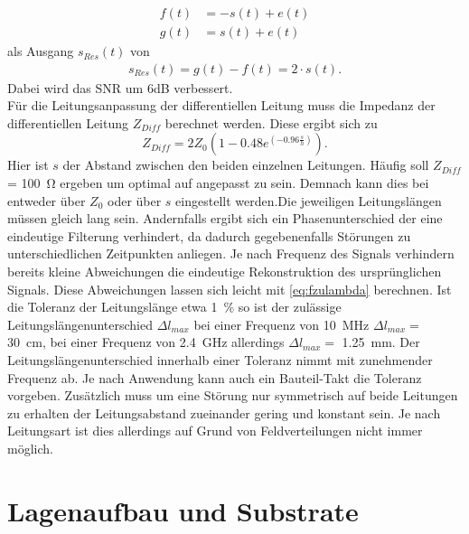 \begin{align}
f(t) &= -s(t) + e(t) \\
g(t) &=  s(t) + e(t)
\end{align}
als Ausgang $s_{Res}(t)$ von
\begin{align}
s_{Res}(t) = g(t) - f(t)= 2\cdot s(t).
\end{align}
Dabei wird das SNR um 6dB verbessert.\\
Für die Leitungsanpassung der differentiellen Leitung muss die Impedanz der differentiellen Leitung $Z_{Diff}$ berechnet werden. Diese ergibt sich zu 
\begin{equation}
Z_{Diff} = 2Z_{0} \left( 1- 0.48e^{\left(-0.96\frac{s}{h} \right)} \right).
\end{equation}
Hier ist $s$ der Abstand zwischen den beiden einzelnen Leitungen. Häufig soll $Z_{Diff}$ = \SI{100}{\ohm} ergeben um optimal auf angepasst zu sein. Demnach kann dies bei entweder über $Z_{0}$ oder über $s$ eingestellt werden.Die jeweiligen Leitungslängen müssen gleich lang sein. Andernfalls ergibt sich ein Phasenunterschied der eine eindeutige Filterung verhindert, da dadurch gegebenenfalls Störungen zu unterschiedlichen Zeitpunkten anliegen. Je nach Frequenz des Signals verhindern bereits kleine Abweichungen die eindeutige Rekonstruktion des ursprünglichen Signals. Diese Abweichungen lassen sich leicht mit \ref{eq:fzulambda} berechnen. Ist die Toleranz der Leitungslänge etwa \SI{1}{\percent} so ist der zulässige Leitungslängenunterschied $\Delta l_{max}$ bei einer Frequenz von \SI{10}{\mega\hertz} $\Delta l_{max} = $ \SI{30}{\centi\meter}, bei einer Frequenz von \SI{2.4}{\giga\hertz} allerdings $\Delta l_{max} =$ \SI{1.25}{\milli\meter}. Der  Leitungslängenunterschied innerhalb einer Toleranz nimmt mit zunehmender Frequenz ab. Je nach Anwendung kann auch ein Bauteil-Takt die Toleranz vorgeben. Zusätzlich muss um eine Störung nur symmetrisch auf beide Leitungen zu erhalten der Leitungsabstand zueinander gering und konstant sein. Je nach Leitungsart ist dies allerdings auf Grund von Feldverteilungen nicht immer möglich.

\section{Lagenaufbau und Substrate}

